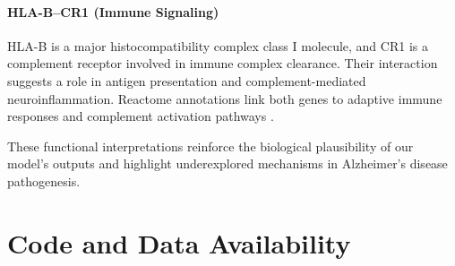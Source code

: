 \documentclass[12pt]{article}
\begin{document}
\paragraph{HLA-B–CR1 (Immune Signaling)}
HLA-B is a major histocompatibility complex class I molecule, and CR1 is a complement receptor involved in immune complex clearance. Their interaction suggests a role in antigen presentation and complement-mediated neuroinflammation. Reactome annotations link both genes to adaptive immune responses and complement activation pathways \citep{reactomeHLABCR1, geneCardsCR1}.

These functional interpretations reinforce the biological plausibility of our model’s outputs and highlight underexplored mechanisms in Alzheimer’s disease pathogenesis.


\section*{Code and Data Availability}

























\end{document}
